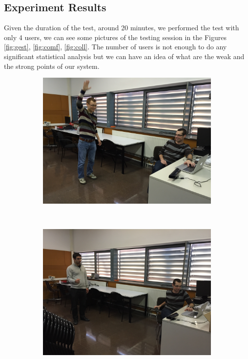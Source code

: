\subsection{Experiment Results}

Given the duration of the test, around 20 minutes, we performed the test with only 4 users, we can see some pictures of the testing session in the Figures \ref{fig:gest}, \ref{fig:comf}, \ref{fig:coll}. The number of users is not enough to do any significant statistical analysis but we can have an idea of what are the weak and the strong points of our system.\\

\begin{figure}[htb!]
	\centering
	\begin{subfigure}[b]{0.3\textwidth}
		\includegraphics[width=\textwidth]{images/2_Gestures_Test.JPG}
		\label{fig:gest1}
	\end{subfigure}%
	~ %
	\begin{subfigure}[b]{0.3\textwidth}
		\includegraphics[width=\textwidth]{images/3_Gestures_Test.JPG}

\end{subfigure}
\end{figure}
